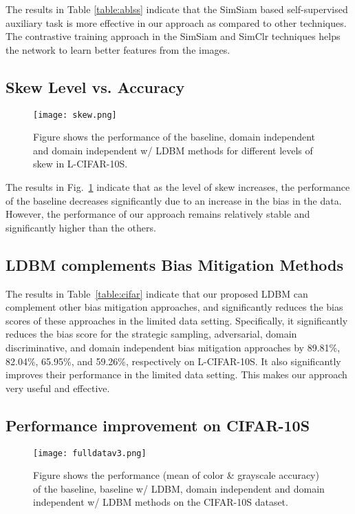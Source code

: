 \documentclass[10pt,twocolumn,letterpaper]{article}
\begin{document}
The results in Table \ref{table:ablss} indicate that the SimSiam based self-supervised auxiliary task is more effective in our approach as compared to other techniques. The contrastive training approach in the SimSiam and SimClr techniques helps the network to learn better features from the images. 


\subsection{Skew Level vs. Accuracy}
\begin{figure}[t]
    \centering
     \texttt{[image: skew.png]}
    \caption{Figure shows the performance of the baseline, domain independent and domain independent w/ LDBM methods for different levels of skew in L-CIFAR-10S.}\label{fig:skew}
\end{figure}

The results in Fig.~\ref{fig:skew} indicate that as the level of skew increases, the performance of the baseline decreases significantly due to an increase in the bias in the data. However, the performance of our approach remains relatively stable and significantly higher than the others.



\subsection{LDBM complements Bias Mitigation Methods}

The results in Table~\ref{table:cifar} indicate that our proposed LDBM can complement other bias mitigation approaches, and significantly reduces the bias scores of these approaches in the limited data setting. Specifically, it significantly reduces the bias score for the strategic sampling, adversarial, domain discriminative, and domain independent bias mitigation approaches by 89.81\%, 82.04\%, 65.95\%, and 59.26\%, respectively on L-CIFAR-10S. It also significantly improves their performance in the limited data setting. This makes our approach very useful and effective.

\subsection{Performance improvement on CIFAR-10S}\label{sec:performsufdata}

\begin{figure}[t]
    \centering
     \texttt{[image: fulldatav3.png]}
    \caption{Figure shows the performance (mean of color \& grayscale accuracy) of the baseline, baseline w/ LDBM, domain independent and domain independent w/ LDBM methods on the CIFAR-10S dataset.}\label{fig:fulldata}
\end{figure}
\end{document}

